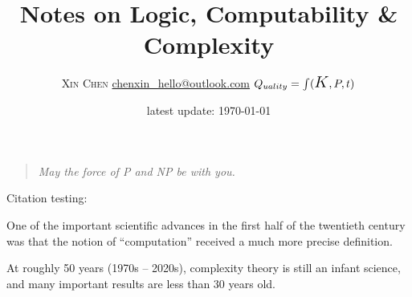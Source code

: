 \documentclass[12pt]{article} %
\title{Notes on Logic, Computability \& Complexity}
\author{\textsc{Xin Chen} \qquad \href{mailto:chenxin_hello@outlook.com}{\textsf{chenxin\_hello@outlook.com}}  
	\qquad 
	$Q_{uality} = \int (\text{\Large $K$},P,t)$}
\date{latest update: \today}
\begin{document}
\maketitle

\begin{quotation}
	\itshape May the force of \textsf{P} and \textsf{NP} be with you. 	
\end{quotation}


\tableofcontents


\medskip

Citation testing: \cite{Aro.Bar2009}

\vspace{2em}

One of the important scientific advances in the first half of the twentieth century was that the notion of ``computation'' received a much more precise definition.


At roughly 50 years (1970s -- 2020s), 
complexity theory is still an infant science, 
and many important results are less than 30 years old.










\clearpage
\printbibliography
{}
\end{document}
